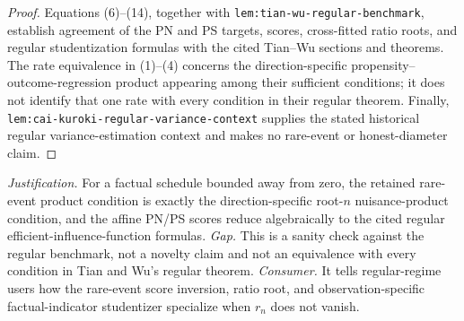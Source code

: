 \documentclass{article}
\begin{document}
\begin{proof}
Equations (6)--(14), together with \texttt{lem:tian-wu-regular-benchmark}, establish agreement of the PN and PS targets, scores, cross-fitted ratio roots, and regular studentization formulas with the cited Tian--Wu sections and theorems. The rate equivalence in (1)--(4) concerns the direction-specific propensity--outcome-regression product appearing among their sufficient conditions; it does not identify that one rate with every condition in their regular theorem. Finally, \texttt{lem:cai-kuroki-regular-variance-context} supplies the stated historical regular variance-estimation context and makes no rare-event or honest-diameter claim.
\end{proof}
\par\smallskip\noindent \textit{Justification.} For a factual schedule bounded away from zero, the retained rare-event product condition is exactly the direction-specific root-\(n\) nuisance-product condition, and the affine PN/PS scores reduce algebraically to the cited regular efficient-influence-function formulas. \textit{Gap.} This is a sanity check against the regular benchmark, not a novelty claim and not an equivalence with every condition in Tian and Wu's regular theorem. \textit{Consumer.} It tells regular-regime users how the rare-event score inversion, ratio root, and observation-specific factual-indicator studentizer specialize when \(r_n\) does not vanish.
\end{document}
